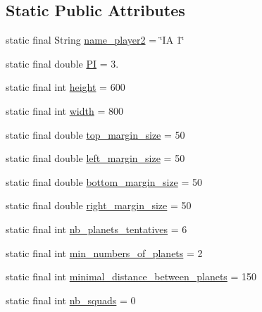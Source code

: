 \subsection*{Static Public Attributes}
\begin{DoxyCompactItemize}
\item 
static final String \hyperlink{classfr_1_1projet_1_1groupe40_1_1util_1_1_constantes_afa9920b6a2a81b225c1733c248b250ac}{name\+\_\+player2} = \char`\"{}IA 1\char`\"{}
\item 
static final double \hyperlink{classfr_1_1projet_1_1groupe40_1_1util_1_1_constantes_ac778f2c49769a86315ab7da9c80c6707}{PI} = 3.
\item 
static final int \hyperlink{classfr_1_1projet_1_1groupe40_1_1util_1_1_constantes_a3aa832f1f1a73d73212e6c268993763f}{height} = 600
\item 
static final int \hyperlink{classfr_1_1projet_1_1groupe40_1_1util_1_1_constantes_a60fe40755417dae681b77621acfabebd}{width} = 800
\item 
static final double \hyperlink{classfr_1_1projet_1_1groupe40_1_1util_1_1_constantes_af7d767a7278f6e925c40373d39a0ee9c}{top\+\_\+margin\+\_\+size} = 50
\item 
static final double \hyperlink{classfr_1_1projet_1_1groupe40_1_1util_1_1_constantes_af515192a5a938c7cdc7aa1603c343918}{left\+\_\+margin\+\_\+size} = 50
\item 
static final double \hyperlink{classfr_1_1projet_1_1groupe40_1_1util_1_1_constantes_ad120e42952260b4b09723a1de78585b2}{bottom\+\_\+margin\+\_\+size} = 50
\item 
static final double \hyperlink{classfr_1_1projet_1_1groupe40_1_1util_1_1_constantes_a4b3510214fa2f517e6ee9efd95d6726b}{right\+\_\+margin\+\_\+size} = 50
\item 
static final int \hyperlink{classfr_1_1projet_1_1groupe40_1_1util_1_1_constantes_acd74074d64acf917e269065ba4cd5699}{nb\+\_\+planets\+\_\+tentatives} = 6
\item 
static final int \hyperlink{classfr_1_1projet_1_1groupe40_1_1util_1_1_constantes_a5af1ddef42b14e6be46461640d985ce6}{min\+\_\+numbers\+\_\+of\+\_\+planets} = 2
\item 
static final int \hyperlink{classfr_1_1projet_1_1groupe40_1_1util_1_1_constantes_a5e025fff7a0228bf0ba5e18e333e6e36}{minimal\+\_\+distance\+\_\+between\+\_\+planets} = 150
\item 
static final int \hyperlink{classfr_1_1projet_1_1groupe40_1_1util_1_1_constantes_af9918a7b68d5977d2b9d191df0ce4cb5}{nb\+\_\+squads} = 0

\end{DoxyCompactItemize}
